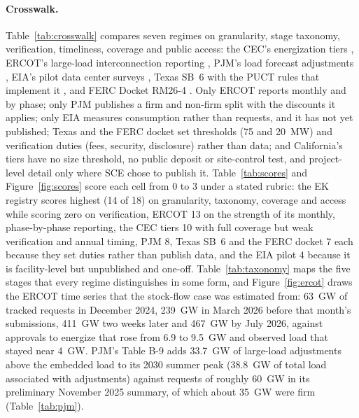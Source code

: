 \paragraph{Crosswalk.} Table~\ref{tab:crosswalk} compares seven regimes on granularity, stage taxonomy, verification, timeliness, coverage and public access: the CEC's energization tiers \citep{cec_dc_memo2026,cec_tn272026,sce_database2026}, ERCOT's large-load interconnection reporting \citep{ercot_tac2026,ercot_ops2026}, PJM's load forecast adjustments \citep{pjm_lar2025,pjm_loadreport2026}, EIA's pilot data center surveys \citep{eia_pilot2026}, Texas SB~6 with the PUCT rules that implement it \citep{texas_sb6,ercot_house2026}, and FERC Docket RM26-4 \citep{ferc_rm26_4,caiso_rm26_4,nerc_llplan2026,ferc_showcause2026}. Only ERCOT reports monthly and by phase; only PJM publishes a firm and non-firm split with the discounts it applies; only EIA measures consumption rather than requests, and it has not yet published; Texas and the FERC docket set thresholds (75 and 20~MW) and verification duties (fees, security, disclosure) rather than data; and California's tiers have no size threshold, no public deposit or site-control test, and project-level detail only where SCE chose to publish it. Table~\ref{tab:scores} and Figure~\ref{fig:scores} score each cell from 0 to 3 under a stated rubric: the EK registry scores highest (14 of 18) on granularity, taxonomy, coverage and access while scoring zero on verification, ERCOT 13 on the strength of its monthly, phase-by-phase reporting, the CEC tiers 10 with full coverage but weak verification and annual timing, PJM 8, Texas SB~6 and the FERC docket 7 each because they set duties rather than publish data, and the EIA pilot 4 because it is facility-level but unpublished and one-off. Table~\ref{tab:taxonomy} maps the five stages that every regime distinguishes in some form, and Figure~\ref{fig:ercot} draws the ERCOT time series that the stock-flow case was estimated from: 63~GW of tracked requests in December 2024, 239~GW in March 2026 before that month's submissions, 411~GW two weeks later and 467~GW by July 2026, against approvals to energize that rose from 6.9 to 9.5~GW and observed load that stayed near 4~GW. PJM's Table B-9 adds 33.7~GW of large-load adjustments above the embedded load to its 2030 summer peak (38.8~GW of total load associated with adjustments) against requests of roughly 60~GW in its preliminary November 2025 summary, of which about 35~GW were firm (Table~\ref{tab:pjm}).

\begin{table}[H]
\centering\scriptsize
\caption{Crosswalk of seven large-load data and measurement regimes.}
\label{tab:crosswalk}
\resizebox{\textwidth}{!}{}
\end{table}

